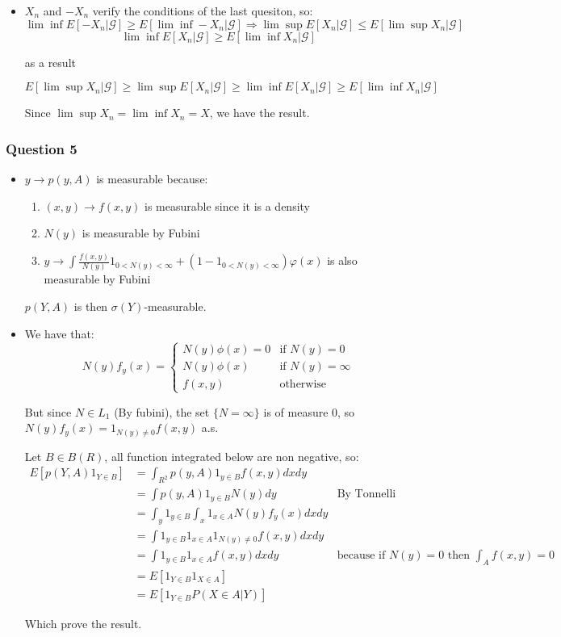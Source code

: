 \documentclass[12pt]{article}
\newcommand{\Q}[1]{\subsubsection*{Question #1}}
\begin{document}
\begin{itemize}
\item 

$X_n$ and $-X_n$ verify the conditions of the last quesiton, so:
$$\lim \inf E[-X_n|\mathcal G] \ge E[\lim \inf -X_n|\mathcal G] \Rightarrow \lim \sup E[X_n|\mathcal G] \le E[\lim \sup X_n|\mathcal G] $$
$$\lim \inf E[X_n|\mathcal G] \ge E[\lim \inf X_n|\mathcal G]$$

as a result 

$$  E[\lim \sup X_n|\mathcal G] \ge  \lim \sup E[X_n|\mathcal G] \ge \lim \inf E[X_n|\mathcal G] \ge E[\lim \inf X_n|\mathcal G]$$

Since $\lim \sup X_n = \lim \inf X_n = X$, we have the result.
\end{itemize}

\Q{5}

\begin{itemize}
\item 
$y \rightarrow p(y, A)$ is measurable because:

\begin{enumerate}
\item $(x, y) \rightarrow f(x, y)$ is measurable since it is a density
\item $N(y)$ is measurable by Fubini
\item $y \rightarrow \int \frac{f(x,y)}{N(y)}1_{0 <N(y) <\infty} + (1-1_{0 <N(y) <\infty}) \varphi(x)$ is also measurable by Fubini
\end{enumerate}

$p(Y, A)$ is then $\sigma(Y)$-measurable.


\item 

We have that:
\[N(y) f_y(x) = \left\{ \begin{array}{cc}
N(y) \phi(x) = 0 & \text{if $N(y) = 0$}\\
N(y)\phi(x) & \text{if $N(y) = \infty$}\\
f(x,y) & \text{otherwise}
\end{array}\right. \]


But since $N \in L_1$ (By fubini), the set $\{N = \infty\}$ is of measure 0, so $N(y) f_y(x) = 1_{N(y) \ne 0} f(x,y)$ a.s.

Let $B \in B(R)$, all function integrated below are non negative, so:
\begin{align*}
E[p(Y, A) 1_{Y \in B}] &= \int_{R^2} p(y, A) 1_{y \in B}f(x,y)dx dy \\
&= \int p(y, A) 1_{y \in B} N(y) dy &\text{By Tonnelli} \\
&= \int_y 1_{y \in B} \int_x 1_{x \in A} N(y) f_y(x) dx dy  \\
&= \int 1_{y \in B} 1_{x \in A} 1_{N(y) \ne 0} f(x, y) dx dy  \\
&= \int 1_{y \in B} 1_{x \in A} f(x, y) dx dy & \text{because if $N(y) = 0$ then $\int_A f(x, y) = 0$} \\
&= E[1_{Y\in B} 1_{X \in A}] \\
&= E[1_{Y \in B} P(X \in A | Y)]
\end{align*}

Which prove the result.
\end{itemize}
\end{document}
